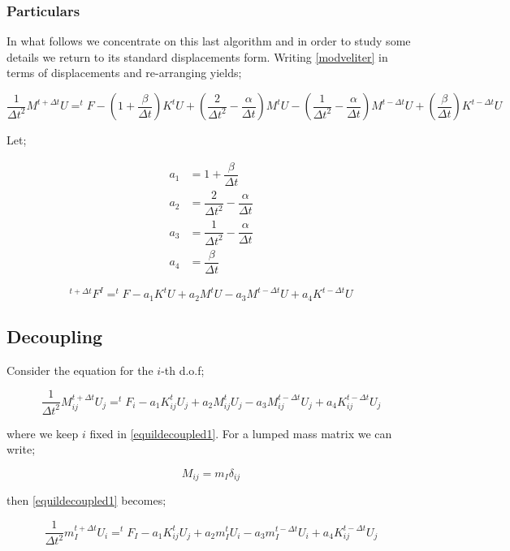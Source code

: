 \subsubsection{Particulars}
In what follows we concentrate on this last algorithm and in order to study some details we return to its standard displacements form. Writing \eqref{modveliter} in terms of displacements and re-arranging yields;


\begin{equation}
\dfrac{1}{\Delta t^2}M ^{t+\Delta t}U=^{t}F-(1+\dfrac{\beta}{\Delta t})K ^{t}U+(\dfrac{2}{\Delta t^2}-\dfrac{\alpha}{\Delta t})M ^{t}U-(\dfrac{1}{\Delta t^2} - \dfrac{\alpha}{\Delta t})M ^{t-\Delta t}U+(\dfrac{\beta}{\Delta t}) K ^{t-\Delta t}U
\label{disequil}
\end{equation}

Let;


\[
\begin{aligned}
a_1&=1+\dfrac{\beta}{\Delta t}\\
a_2&=\dfrac{2}{\Delta t^2}-\dfrac{\alpha}{\Delta t}\\
a_3&=\dfrac{1}{\Delta t^2} - \dfrac{\alpha}{\Delta t}\\
a_4&=\dfrac{\beta}{\Delta t}
\end{aligned}
\]


\begin{equation}
^{t+\Delta t}F^I=^{t}F-a_1K ^{t}U+a_2M ^{t}U-a_3M ^{t-\Delta t}U+a_4K ^{t-\Delta t}U
\label{equliassum3}
\end{equation}


\subsection{Decoupling}
Consider the equation for the $i$-th d.o.f;

\begin{equation}
\dfrac{1}{\Delta t^2}M_{ij} ^{t+ \Delta t}U_j=^{t}F_i-a_1K_{ij} ^{t}U_j+a_2M_{ij}^{t}U_j-a_3M_{ij} ^{t-\Delta t}U_j+a_4K_{ij}^{t-\Delta t}U_j
\label{equildecoupled1}
\end{equation}

where we keep $i$ fixed in \eqref{equildecoupled1}. For a lumped mass matrix we can write;

\[
M_{ij}=m_I\delta_{ij}
\]

then \eqref{equildecoupled1} becomes;

\begin{equation}
\dfrac{1}{\Delta t^2}m_I ^{t+ \Delta t}U_i= ^{t}F_I-a_1 K_{ij} ^{t}U_j+a_2 m_I ^{t}U_i-a_3 m_I ^{t-\Delta t} U_i+a_4 K_{ij} ^{t-\Delta t} U_j
\label{equildecoupled2}
\end{equation}

